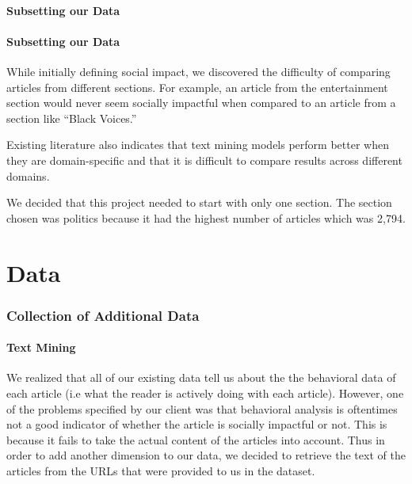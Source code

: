 \documentclass[10pt,letterpaper]{article}
\begin{document}
\paragraph{Subsetting our Data}\label{subsetting-our-data}
\hypertarget{subsetting-our-data}{%
\paragraph{Subsetting our Data}\label{subsetting-our-data}}

While initially defining social impact, we discovered the difficulty of
comparing articles from different sections. For example, an article from
the entertainment section would never seem socially impactful when
compared to an article from a section like ``Black Voices.''

Existing literature also indicates that text mining models perform
better when they are domain-specific and that it is difficult to compare
results across different domains.

We decided that this project needed to start with only one section. The
section chosen was politics because it had the highest number of
articles which was 2,794.

\section{Data}\label{data}

\subsubsection{Collection of Additional
Data}\label{collection-of-additional-data}

\paragraph{Text Mining}\label{text-mining}

We realized that all of our existing data tell us about the the
behavioral data of each article (i.e what the reader is actively doing
with each article). However, one of the problems specified by our client
was that behavioral analysis is oftentimes not a good indicator of
whether the article is socially impactful or not. This is because it
fails to take the actual content of the articles into account. Thus in
order to add another dimension to our data, we decided to retrieve the
text of the articles from the URLs that were provided to us in the
dataset.
\end{document}
